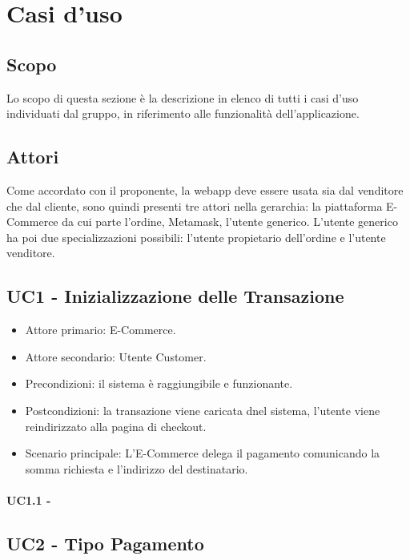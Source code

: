 \section{Casi d'uso}

\subsection{Scopo}
Lo scopo di questa sezione è la descrizione in elenco di tutti i casi d’uso individuati dal gruppo, in
riferimento alle funzionalità dell’applicazione.

\subsection{Attori}
Come accordato con il proponente, la webapp deve essere usata sia dal venditore che dal cliente,
sono quindi presenti tre attori nella gerarchia: la piattaforma E-Commerce da cui parte l'ordine, Metamask\glo, l'utente generico.
L'utente generico ha poi due specializzazioni possibili: l'utente propietario dell'ordine e l'utente venditore.

\subsection{UC1 - Inizializzazione delle Transazione}

\begin{itemize}
    \item Attore primario: E-Commerce.
    \item Attore secondario: Utente Customer.
    \item Precondizioni: il sistema è raggiungibile e funzionante.
    \item Postcondizioni: la transazione viene caricata dnel sistema, l'utente viene reindirizzato alla pagina di checkout.
    \item Scenario principale: L'E-Commerce delega il pagamento comunicando la somma richiesta e l'indirizzo del destinatario.
\end{itemize}

\paragraph{UC1.1 - }

\subsection{UC2 - Tipo Pagamento}

